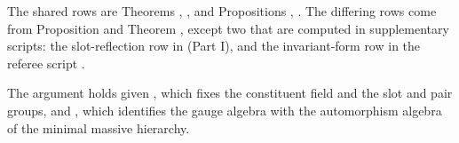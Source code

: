 The shared rows are Theorems , ,  and Propositions , . The differing rows come from Proposition  and Theorem , except two that are computed in supplementary scripts: the slot-reflection row in  (Part I), and the invariant-form row in the referee script .

The argument holds given , which fixes the constituent field and the slot and pair groups, and , which identifies the gauge algebra with the automorphism algebra of the minimal massive hierarchy.
